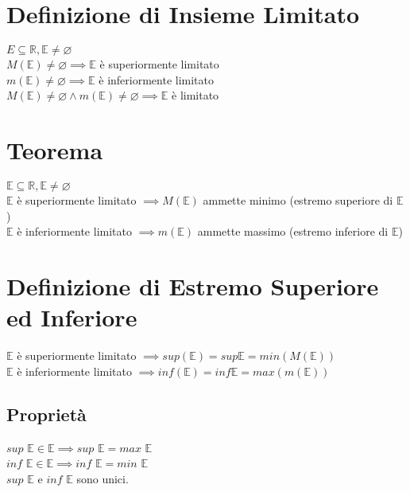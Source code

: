 \documentclass[a4paper, twoside, italian, 11pt]{book}
\newcommand{\R}{\mathbb{R}}
\newcommand{\E}{\mathbb{E}}
\let\emptyset\varnothing
\begin{document}
\section{Definizione di Insieme Limitato}

\noindent
$E \subseteq \R, \E \neq \emptyset$ \\

\noindent
$M(\E) \neq \emptyset \implies \E$ è superiormente limitato \\
$m(\E) \neq \emptyset \implies \E$ è inferiormente limitato \\
$M(\E) \neq \emptyset \land m(\E) \neq \emptyset \implies \E$ è limitato



\section{Teorema}

\noindent
$\E \subseteq \R, \E \neq \emptyset$ \\

\noindent
$\E$ è superiormente limitato $\implies M(\E)$ ammette minimo (estremo superiore di $\E$) \\

\noindent
$\E$ è inferiormente limitato $\implies m(\E)$ ammette massimo (estremo inferiore di $\E$)




\section{Definizione di Estremo Superiore ed Inferiore}

\noindent
$\E$ è superiormente limitato $\implies sup(\E) = sup \E = min(M(\E))$ \\

\noindent
$\E$ è inferiormente limitato $\implies inf(\E) = inf \E = max(m(\E))$


\subsection{Proprietà}

\noindent
$sup$ $\E \in \E \implies sup$ $\E = max$ $\E$ \\
$inf$ $\E \in \E \implies inf$ $\E = min$ $\E$ \\
$sup$ $\E$ e $inf$ $\E$ sono unici.
\end{document}
